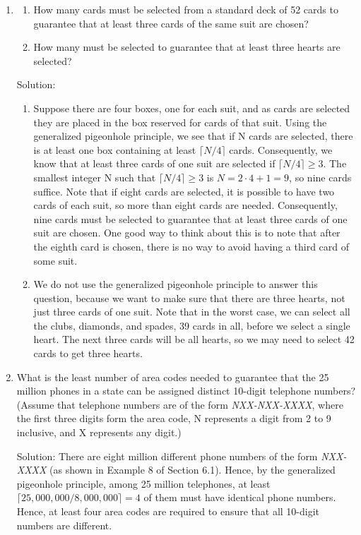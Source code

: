 \documentclass[11pt,a4paper]{book}
\begin{document}
\begin{enumerate}[label=Example~\arabic*]
\item \begin{enumerate}[label=(\alph*)]
\item How many cards must be selected from a standard deck of 52 cards to guarantee that at least three cards of the same suit are chosen?
\item How many must be selected to guarantee that at least three hearts are selected?
\end{enumerate}

Solution: \begin{enumerate}[label=(\alph*)]
\item Suppose there are four boxes, one for each suit, and as cards are selected they are placed in the box reserved for cards of that suit.
Using the generalized pigeonhole principle, we see that if N cards are selected, there is at least one box containing at least $\lceil N/4\rceil$ cards.
Consequently, we know that at least three cards of one suit are selected if $\lceil N/4\rceil \geq 3$.
The smallest integer N such that $\lceil N/4\rceil \geq 3$ is $N = 2 \cdot 4 + 1 = 9$, so nine cards suffice.
Note that if eight cards are selected, it is possible to have two cards of each suit, so more than eight cards are needed.
Consequently, nine cards must be selected to guarantee that at least three cards of one suit are chosen.
One good way to think about this is to note that after the eighth card is chosen, there is no way to avoid having a third card of some suit.
\item We do not use the generalized pigeonhole principle to answer this question, because we want to make sure that there are three hearts, not just three cards of one suit.
Note that in the worst case, we can select all the clubs, diamonds, and spades, 39 cards in all, before we select a single heart.
The next three cards will be all hearts, so we may need to select 42 cards to get three hearts.
\end{enumerate}

\item What is the least number of area codes needed to guarantee that the 25 million phones in a state can be assigned distinct 10-digit telephone numbers? (Assume that telephone numbers are of the form \emph{NXX-NXX-XXXX}, where the first three digits form the area code, N represents a digit from 2 to 9 inclusive, and X represents any digit.)

Solution: There are eight million different phone numbers of the form \emph{NXX-XXXX} (as shown in Example 8 of Section 6.1).
Hence, by the generalized pigeonhole principle, among 25 million telephones, at least $\lceil 25,000,000/8,000,000\rceil = 4$ of them must have identical phone numbers.
Hence, at least four area codes are required to ensure that all 10-digit numbers are different. 


\end{enumerate}
\end{document}
